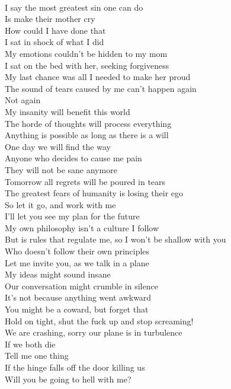 \documentclass[12pt, b5paper, oneside]{book}
\begin{document}
\\I say the most greatest sin one can do
\\Is make their mother cry
\\How could I have done that
\\I sat in shock of what I did
\\My emotions couldn't be hidden to my mom
\\I sat on the bed with her, seeking forgiveness
\\My last chance was all I needed to make her proud
\\The sound of tears caused by me can't happen again
\\Not again
\\My insanity will benefit this world
\\The horde of thoughts will process everything
\\Anything is possible as long as there is a will
\\One day we will find the way
\\Anyone who decides to cause me pain
\\They will not be sane anymore
\\Tomorrow all regrets will be poured in tears
\\The greatest fears of humanity is losing their ego
\\So let it go, and work with me
\\I'll let you see my plan for the future
\\My own philosophy isn't a culture I follow
\\But is rules that regulate me, so I won't be shallow with you
\\Who doesn't follow their own principles
\\Let me invite you, as we talk in a plane
\\My ideas might sound insane
\\Our conversation might crumble in silence
\\It's not because anything went awkward
\\You might be a coward, but forget that
\\Hold on tight, shut the fuck up and stop screaming!
\\We are crashing, sorry our plane is in turbulence
\\If we both die
\\Tell me one thing
\\If the hinge falls off the door killing us
\\Will you be going to hell with me? 
\newpage
\end{document}

